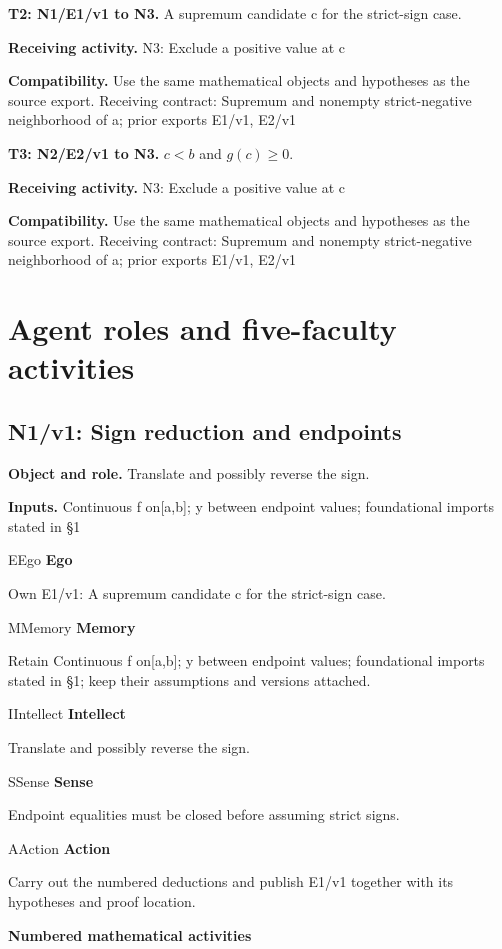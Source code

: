 \documentclass[preprint,12pt,aps,pra,showkeys,amsmath,amssymb,superscriptaddress,floatfix]{revtex4-2}
\theoremstyle{definition}
\theoremstyle{remark}
\newcommand{\mmfaculty}[3]{%
 \begin{mmfacultybox}{#1}{#2}
 {\sffamily\bfseries\color{MMBlue}#2}\par\smallskip #3
 \end{mmfacultybox}}
\newcommand{\field}[2]{\par\smallskip\noindent\textbf{#1.} #2\par}
\begin{document}
\field{T2: N1/E1/v1 to N3}{A supremum candidate c for the strict-sign case.}

\field{Receiving activity}{N3: Exclude a positive value at c}

\field{Compatibility}{Use the same mathematical objects and hypotheses as the source export.
Receiving contract: Supremum and nonempty strict-negative neighborhood
of a; prior exports E1/v1, E2/v1}

\field{T3: N2/E2/v1 to N3}{\(c<b\) and \(g(c)\ge 0\).}

\field{Receiving activity}{N3: Exclude a positive value at c}

\field{Compatibility}{Use the same mathematical objects and hypotheses as the source export.
Receiving contract: Supremum and nonempty strict-negative neighborhood
of a; prior exports E1/v1, E2/v1}

\endgroup

\clearpage\section{Agent roles and five-faculty activities}\begingroup\small\linespread{1.05}\selectfont{}

\subsection{N1/v1: Sign reduction and endpoints}

\field{Object and role}{Translate and possibly reverse the sign.}

\field{Inputs}{Continuous f on{[}a,b{]}; y between endpoint values; foundational
imports stated in §1}

\mmfaculty{E}{Ego}{Own E1/v1: A supremum candidate c for the strict-sign case.}

\mmfaculty{M}{Memory}{Retain Continuous f on{[}a,b{]}; y between endpoint values; foundational
imports stated in §1; keep their assumptions and versions attached.}

\mmfaculty{I}{Intellect}{Translate and possibly reverse the sign.}

\mmfaculty{S}{Sense}{Endpoint equalities must be closed before assuming strict signs.}

\mmfaculty{A}{Action}{Carry out the numbered deductions and publish E1/v1 together with its
hypotheses and proof location.}

\smallskip\noindent\textbf{Numbered mathematical activities}
\end{document}
